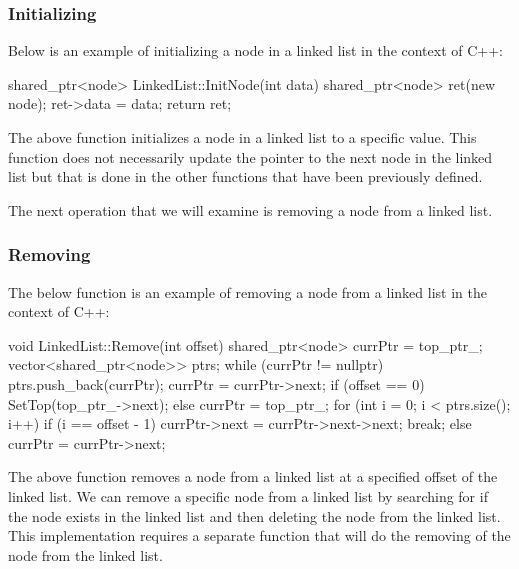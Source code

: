 \begin{highlight}

\subsubsection*{Initializing}

Below is an example of initializing a node in a linked list in the context of C++:

\begin{code}
shared_ptr<node> LinkedList::InitNode(int data){
    shared_ptr<node> ret(new node);
    ret->data = data;
    return ret;
}
\end{code}

The above function initializes a node in a linked list to a specific value. This function does not necessarily update the pointer to the next node in the linked list but that is done in the other
functions that have been previously defined.

\end{highlight}

The next operation that we will examine is removing a node from a linked list.

\begin{highlight}

\subsubsection*{Removing}

The below function is an example of removing a node from a linked list in the context of C++:

\begin{code}
void LinkedList::Remove(int offset){
    shared_ptr<node> currPtr = top_ptr_;
    vector<shared_ptr<node>> ptrs;
    while (currPtr != nullptr) {
        ptrs.push_back(currPtr);
        currPtr = currPtr->next;
    }
    if (offset == 0) {
        SetTop(top_ptr_->next);
    }
    else {
        currPtr = top_ptr_;
        for (int i = 0; i < ptrs.size(); i++) {
            if (i == offset - 1) {
                currPtr->next = currPtr->next->next;
                break;
            }
            else {}
            currPtr = currPtr->next;
        }
    }
}
\end{code}

The above function removes a node from a linked list at a specified offset of the linked list. We can remove a specific node from a linked list by searching for if the node exists in the linked list
and then deleting the node from the linked list. This implementation requires a separate function that will do the removing of the node from the linked list.

\end{highlight}

